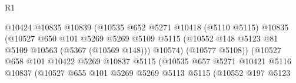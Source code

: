 \begin{lexlean}{R1}
\begin{coremodule}
                                            @10424
                                            @10835
                                            @10839
                                            (@10535
                                              @652
                                              @5271
                                              @10418
                                              (@5110 @5115)
                                              @10835
                                              (@10527
                                                @650
                                                @101
                                                @5269
                                                @5269
                                                @5109
                                                @5115
                                                (@10552
                                                  @148
                                                  @5123
                                                  @81
                                                  @5109
                                                  @10563
                                                  (@5367 (@10569 @148)))
                                                @10574)
                                              (@10577 @5108))
                                            (@10527
                                              @658
                                              @101
                                              @10422
                                              @5269
                                              @10837
                                              @5115
                                              (@10535
                                                @657
                                                @5271
                                                @10421
                                                @5116
                                                @10837
                                                (@10527
                                                  @655
                                                  @101
                                                  @5269
                                                  @5269
                                                  @5113
                                                  @5115
                                                  (@10552
                                                    @197
                                                    @5123

\end{coremodule}
\end{lexlean}
